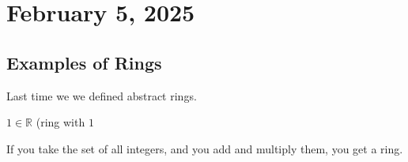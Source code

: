 \documentclass[11pt]{article}
\begin{document}

\section{February 5, 2025}

\subsection{Examples of Rings}
Last time we we defined abstract rings.
\begin{remark}
    \(1 \in \mathbb{R}\) (ring with \(1\)
\end{remark}

\begin{fact}
    If you take the set of all integers, and you add and multiply them, you get a ring.
\end{fact}
\end{document}
